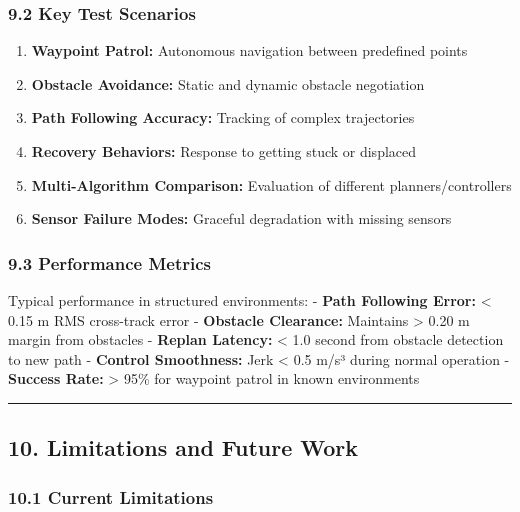 \hypertarget{key-test-scenarios}{%
\subsubsection{9.2 Key Test Scenarios}\label{key-test-scenarios}}

\begin{enumerate}
\def\labelenumi{\arabic{enumi}.}
\tightlist
\item
  \textbf{Waypoint Patrol:} Autonomous navigation between predefined
  points
\item
  \textbf{Obstacle Avoidance:} Static and dynamic obstacle negotiation
\item
  \textbf{Path Following Accuracy:} Tracking of complex trajectories
\item
  \textbf{Recovery Behaviors:} Response to getting stuck or displaced
\item
  \textbf{Multi-Algorithm Comparison:} Evaluation of different
  planners/controllers
\item
  \textbf{Sensor Failure Modes:} Graceful degradation with missing
  sensors
\end{enumerate}

\hypertarget{performance-metrics}{%
\subsubsection{9.3 Performance Metrics}\label{performance-metrics}}

Typical performance in structured environments: - \textbf{Path Following
Error:} \textless{} 0.15 m RMS cross-track error - \textbf{Obstacle
Clearance:} Maintains \textgreater{} 0.20 m margin from obstacles -
\textbf{Replan Latency:} \textless{} 1.0 second from obstacle detection
to new path - \textbf{Control Smoothness:} Jerk \textless{} 0.5 m/s³
during normal operation - \textbf{Success Rate:} \textgreater{} 95\% for
waypoint patrol in known environments

\begin{center}\rule{0.5\linewidth}{0.5pt}\end{center}

\hypertarget{limitations-and-future-work}{%
\subsection{10. Limitations and Future
Work}\label{limitations-and-future-work}}

\hypertarget{current-limitations}{%
\subsubsection{10.1 Current Limitations}\label{current-limitations}}

